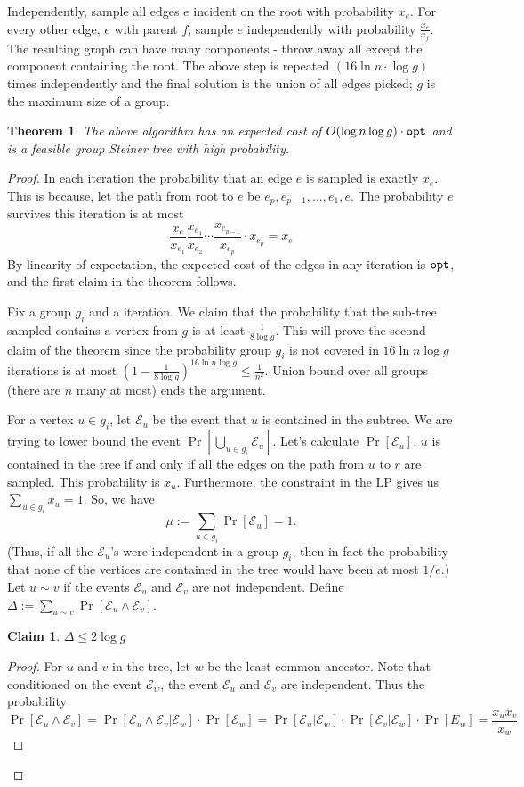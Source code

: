 \documentclass[11pt]{article}
\newtheorem{theorem}{Theorem}
\newtheorem{claim}{Claim}
\def\opt{{\tt opt}}
\begin{document}
Independently, sample all edges $e$ incident on the root with probability $x_e$. For every other edge,
$e$ with parent $f$, sample $e$ independently with probability $\frac{x_e}{x_f}$.  The resulting graph can have many components - throw away all except the component containing the root.
The above step is repeated $(16\ln n\cdot \log g)$ times independently and the final solution is the union of all edges picked; $g$ is the maximum size of a group. 
\def\E{{\mathcal E}}
\begin{theorem}
The above algorithm has an expected cost of $O(\log n\log g)\cdot \opt$
and is a feasible group Steiner tree with high probability.
\end{theorem}
\begin{proof}
In each iteration the probability that an edge $e$ is sampled is exactly $x_e$. 
This is because, let the path from root to $e$ be $e_p,e_{p-1},\ldots,e_1,e$.
The probability $e$ survives this iteration is at most 
$$\frac{x_e}{x_{e_1}}\frac{x_{e_1}}{x_{e_2}}\cdots \frac{x_{e_{p-1}}}{x_{e_p}}\cdot x_{e_p} = x_e$$
By linearity of expectation, the expected cost of the edges in any iteration is $\opt$,
and the first claim in the theorem follows.

Fix a group $g_i$ and a iteration. We claim that the probability that the sub-tree sampled contains a vertex from $g$ is at least $\frac{1}{8\log g}$. This will prove the second claim of the theorem since the probability group $g_i$ is not covered in $16\ln n\log g$ iterations is at most $\left(1 - \frac{1}{8\log g}\right)^{16\ln n\log g} \le \frac{1}{n^2}$. Union bound over all groups (there are $n$ many at most) ends the argument. 


For a vertex $u\in g_i$, let $\E_u$ be the event that $u$ is contained in the subtree. We are trying to lower bound the event $\Pr[\bigcup_{u\in g_i} \E_u]$. Let's calculate $\Pr[\E_u]$. $u$ is contained in the tree if and only if all the edges on the path from $u$ to $r$ are sampled. This probability is $x_u$.
Furthermore, the constraint in the LP gives us $\sum_{u\in g_i} x_{u} = 1$. So, we have $$\mu := \sum_{u\in g_i} \Pr[\E_u] = 1.$$ (Thus, if all the $\E_u$'s were independent in a group $g_i$, then in fact the probability that none of the vertices are contained in the tree would have been at most $1/e$.) Let $u \sim v$ if the events $\E_u$ and $\E_v$ are not independent. Define $\Delta := \sum_{u\sim v} \Pr[\E_u \wedge \E_v]$.

\begin{claim}
$\Delta \le 2\log g$
\end{claim}
\begin{proof}
For $u$ and $v$ in the tree, let $w$ be the least common ancestor. 
Note that conditioned on the event $\E_w$, the event $\E_u$ and $\E_v$ are independent.
Thus the probability $$\Pr[\E_u \wedge \E_v] = \Pr[\E_u \wedge \E_v| \E_w]\cdot \Pr[\E_w] = \Pr[\E_u|\E_w]\cdot \Pr[\E_v|\E_w] \cdot \Pr[E_w] = \frac{x_ux_v}{x_w}$$


\end{proof}
\end{proof}
\end{document}
